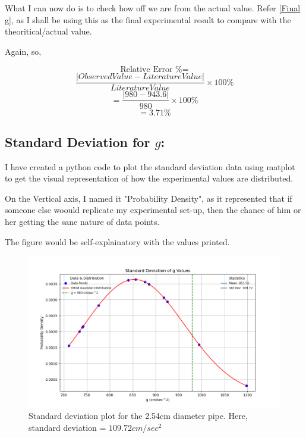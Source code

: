 \documentclass[twocolumn,11pt]{article}
\begin{document}
What I can now do is to check how off we are from the actual value.
Refer \eqref{Final g}, as I shall be using this as the final experimental result to compare with the theoritical/actual value.

Again, so,

$$\text{Relative Error \%} =$$
\begin{equation}
\label{Relative_Error}
\frac{|Observed Value-Literature Value|}{Literature Value} \times 100 \%
\end{equation}
$$=\frac{|980-943.6|}{980} \times 100 \%$$
$$=3.71\%$$
\subsection{Standard Deviation for $g$:}

I have created a python code to plot the standard deviation data using matplot to get the visual representation of how the experimental values are distributed.

On the Vertical axis, I named it "Probability Density", as it represented that if someone else woould replicate my experimental set-up, then the chance of him or her getting the sane nature of data points.

The figure would be self-explainatory with the values printed.

\begin{figure}[H]
    \centering
    \includegraphics[scale = 0.35]{std_dev_plot_thick.png}
    \caption{Standard deviation plot for the 2.54cm diameter pipe. Here, standard deviation = $109.72cm/sec^2$ }
    \label{fig:enter-label}
\end{figure}
\end{document}
